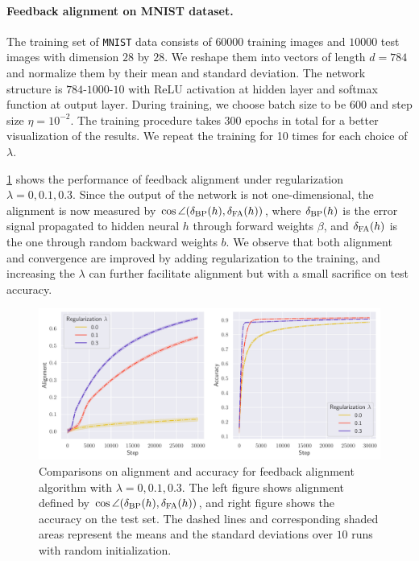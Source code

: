 \paragraph{Feedback alignment on MNIST dataset.}

The training set of \texttt{MNIST} data consists of $60000$ training images and $10000$ test images with dimension $28$ by $28$. We reshape them into vectors of length $d = 784$ and normalize them by their mean and standard deviation. The network structure is $784$-$1000$-$10$ with ReLU activation at hidden layer and softmax function at output layer. During training, we choose batch size to be $600$ and step size $\eta = 10^{-2}$. The training procedure takes $300$ epochs in total for a better visualization of the results. We repeat the training for 10 times for each choice of $\lambda$.

\cref{fig:mnist} shows the performance of feedback alignment under regularization $\lambda = 0, 0.1, 0.3$. Since the output of the network is not one-dimensional, the alignment is now measured by $\cos \angle(\delta_\mathrm{BP}(h),\delta_\mathrm{FA}(h))$, where $\delta_\mathrm{BP}(h)$ is the error signal propagated to hidden neural $h$ through forward weights $\beta$, and $\delta_\mathrm{FA}(h)$ is the one through random backward weights $b$. We observe that both alignment and convergence are improved by adding regularization to the training, and increasing the $\lambda$ can further facilitate alignment but with a small sacrifice on test accuracy.

\begin{figure}[t]
  \centering
  \includegraphics[width=\textwidth]{figures/mnist_2l_v6_horizontal.pdf}
  \caption{Comparisons on alignment and accuracy for feedback alignment algorithm with $\lambda=0,0.1,0.3$. The left figure shows alignment defined by $\cos \angle(\delta_\mathrm{BP}(h),\delta_\mathrm{FA}(h))$, and right figure shows the accuracy on the test set. The dashed lines and corresponding shaded areas represent the means and the standard deviations over $10$ runs with random initialization.}
  \label{fig:mnist}
\end{figure}